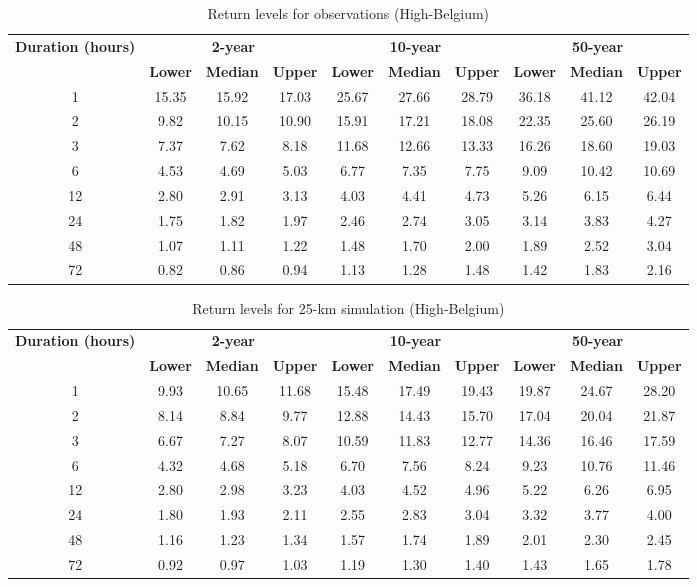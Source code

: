 \begin{table}[p]
\centering
\caption{Return levels for observations (High-Belgium)}
\label{tab:observations}
\begin{tabular}{c||ccc||ccc||ccc}
\hline
\textbf{Duration (hours)} & \multicolumn{3}{c||}{\textbf{2-year}} & \multicolumn{3}{c||}{\textbf{10-year}} & \multicolumn{3}{c}{\textbf{50-year}} \\
\cline{2-10}
& \textbf{Lower} & \textbf{Median} & \textbf{Upper} & \textbf{Lower} & \textbf{Median} & \textbf{Upper} & \textbf{Lower} & \textbf{Median} & \textbf{Upper} \\
\hline
1 & 15.35 & 15.92 & 17.03 & 25.67 & 27.66 & 28.79 & 36.18 & 41.12 & 42.04 \\
2 & 9.82 & 10.15 & 10.90 & 15.91 & 17.21 & 18.08 & 22.35 & 25.60 & 26.19 \\
3 & 7.37 & 7.62 & 8.18 & 11.68 & 12.66 & 13.33 & 16.26 & 18.60 & 19.03 \\
6 & 4.53 & 4.69 & 5.03 & 6.77 & 7.35 & 7.75 & 9.09 & 10.42 & 10.69 \\
12 & 2.80 & 2.91 & 3.13 & 4.03 & 4.41 & 4.73 & 5.26 & 6.15 & 6.44 \\
24 & 1.75 & 1.82 & 1.97 & 2.46 & 2.74 & 3.05 & 3.14 & 3.83 & 4.27 \\
48 & 1.07 & 1.11 & 1.22 & 1.48 & 1.70 & 2.00 & 1.89 & 2.52 & 3.04 \\
72 & 0.82 & 0.86 & 0.94 & 1.13 & 1.28 & 1.48 & 1.42 & 1.83 & 2.16 \\
\hline
\end{tabular}
\end{table}

\begin{table}[p]
\centering
\caption{Return levels for 25-km simulation (High-Belgium)}
\label{tab:observations}
\begin{tabular}{c||ccc||ccc||ccc}
\hline
\textbf{Duration (hours)} & \multicolumn{3}{c||}{\textbf{2-year}} & \multicolumn{3}{c||}{\textbf{10-year}} & \multicolumn{3}{c}{\textbf{50-year}} \\
\cline{2-10}
& \textbf{Lower} & \textbf{Median} & \textbf{Upper} & \textbf{Lower} & \textbf{Median} & \textbf{Upper} & \textbf{Lower} & \textbf{Median} & \textbf{Upper} \\
\hline
1 & 9.93 & 10.65 & 11.68 & 15.48 & 17.49 & 19.43 & 19.87 & 24.67 & 28.20 \\
2 & 8.14 & 8.84 & 9.77 & 12.88 & 14.43 & 15.70 & 17.04 & 20.04 & 21.87 \\
3 & 6.67 & 7.27 & 8.07 & 10.59 & 11.83 & 12.77 & 14.36 & 16.46 & 17.59 \\
6 & 4.32 & 4.68 & 5.18 & 6.70 & 7.56 & 8.24 & 9.23 & 10.76 & 11.46 \\
12 & 2.80 & 2.98 & 3.23 & 4.03 & 4.52 & 4.96 & 5.22 & 6.26 & 6.95 \\
24 & 1.80 & 1.93 & 2.11 & 2.55 & 2.83 & 3.04 & 3.32 & 3.77 & 4.00 \\
48 & 1.16 & 1.23 & 1.34 & 1.57 & 1.74 & 1.89 & 2.01 & 2.30 & 2.45 \\
72 & 0.92 & 0.97 & 1.03 & 1.19 & 1.30 & 1.40 & 1.43 & 1.65 & 1.78 \\
\hline
\end{tabular}
\end{table}

